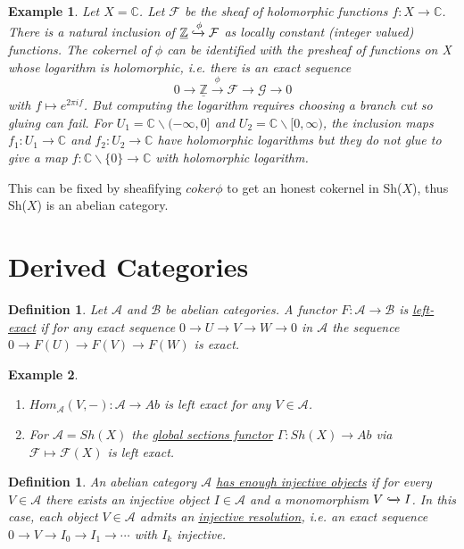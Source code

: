 \documentclass{book}
\newtheorem{definition}[theorem]{Definition}
\newtheorem{example}{Example}[section]
\begin{document}
\begin{example}
Let $X=\mathbb{C}$. Let $\mathcal{F}$ be the sheaf of holomorphic functions $f:X \rightarrow \mathbb{C}$. There is a natural inclusion of $\underline{\mathbb{Z}} \xhookrightarrow{\phi} \mathcal{F}$ as locally constant (integer valued) functions. The cokernel of $\phi$ can be identified with the presheaf of functions on X whose logarithm is holomorphic, i.e. there is an exact sequence $$0 \rightarrow \underline{\mathbb{Z}} \xrightarrow{\phi} \mathcal{F} \rightarrow \mathcal{G} \rightarrow 0$$ with $f \mapsto e^{2\pi i f}$. But computing the logarithm requires choosing a branch cut so gluing can fail. For $U_1=\mathbb{C} \backslash (-\infty,0]$ and $U_2=\mathbb{C} \backslash [0,\infty )$, the inclusion maps $f_1:U_1 \rightarrow \mathbb{C}$ and $f_2:U_2 \rightarrow \mathbb{C}$ have holomorphic logarithms but they do not glue to give a map $f:\mathbb{C} \backslash \{ 0\} \rightarrow \mathbb{C}$ with holomorphic logarithm. 
\end{example}

This can be fixed by sheafifying $coker\phi$ to get an honest cokernel in Sh($X$), thus Sh($X$) is an abelian category. 

\section{Derived Categories}

\begin{definition}
Let $\mathcal{A}$ and $\mathcal{B}$ be abelian categories. A functor $F:\mathcal{A} \rightarrow \mathcal{B}$ is \underline{left-exact} if for any exact sequence $0\rightarrow U \rightarrow V \rightarrow W \rightarrow 0$ in $\mathcal{A}$ the sequence $0\rightarrow F(U) \rightarrow F(V) \rightarrow F(W)$ is exact. 
\end{definition}

\begin{example}
\begin{enumerate}
\item $Hom_{\mathcal{A}}(V,-):\mathcal{A}\rightarrow Ab$ is left exact for any $V\in \mathcal{A}$.
\item For  $\mathcal{A}=Sh(X)$ the \underline{global sections functor} $\Gamma : Sh(X) \rightarrow Ab$ via $\mathcal{F} \mapsto \mathcal{F}(X)$ is left exact. 
\end{enumerate}
\end{example}

\begin{definition}
An abelian category $\mathcal{A}$ \underline{has enough injective objects} if for every $V\in \mathcal{A}$ there exists an injective object $I\in \mathcal{A}$ and a monomorphism $V \xhookrightarrow{} I$. In this case, each object $V\in \mathcal{A}$ admits an \underline{injective resolution}, i.e. an exact sequence $0\rightarrow V \rightarrow I_0 \rightarrow I_1 \rightarrow \cdots$ with $I_k$ injective. 
\end{definition}
\end{document}
